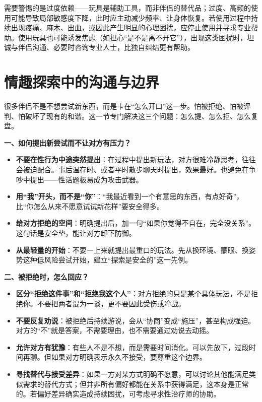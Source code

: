 \documentclass[12pt,UTF8]{ctexbook}
\begin{document}
需要警惕的是过度依赖——玩具是辅助工具，而非伴侣的替代品；过度、高频的使用可能导致局部敏感度下降，此时应主动减少频率、让身体恢复。若使用过程中持续出现疼痛、麻木、出血，或因此产生明显的心理困扰，应停止使用并寻求专业帮助。使用玩具也可能诱发焦虑（如担心“是不是离不开它”），出现这类困扰时，坦诚与伴侣沟通、必要时咨询专业人士，比独自纠结更有帮助。

\section{情趣探索中的沟通与边界}

很多伴侣不是不想尝试新东西，而是卡在“怎么开口”这一步。怕被拒绝、怕被评判、怕破坏了现有的和谐。这一节专门解决这三个问题：怎么提、怎么拒、怎么复盘。

\textbf{一、如何提出新尝试而不让对方有压力？}

\begin{itemize}
\item \textbf{不要在性行为中途突然提出}：在过程中提出新玩法，对方很难冷静思考，往往会被迫配合。事后温存时、或者平时散步聊天时提出，效果最好。也避免在争吵中提出——性话题极易成为攻击武器。
\item \textbf{用“我”开头，而不是“你”}：“我最近看到一个有意思的东西，有点好奇”，比“你怎么从来不愿意试试新花样”要安全得多。
\item \textbf{给对方拒绝的空间}：明确提出后，加一句“如果你觉得不自在，完全没关系”。这句话是安全垫，能让对方卸下防御。
\item \textbf{从最轻量的开始}：不要一上来就提出最重口的玩法。先从换环境、蒙眼、换姿势这种低风险尝试开始，建立“探索是安全的”这一先例。
\end{itemize}

\textbf{二、被拒绝时，怎么回应？}

\begin{itemize}
\item \textbf{区分“拒绝这件事”和“拒绝我这个人”}：对方拒绝的只是某个具体玩法，不是拒绝你。不要把两者混为一谈，更不要因此受伤或冷战。
\item \textbf{不要反复劝说}：被拒绝后持续游说，会从“协商”变成“施压”，甚至构成强迫。对方的“不”就是答案，不需要理由，也不需要通过劝说去动摇。
\item \textbf{允许对方有犹豫}：有些人不是不想，而是需要时间消化。可以先放下，过段时间再聊。但如果对方明确表示永久不接受，要尊重这个边界。
\item \textbf{寻找替代与接受差异}：如果一方对某方式明确不愿意，可以讨论其他能满足类似需求的替代方式；但并非所有偏好都能在关系中获得满足，这本身是正常的。若偏好差异确实造成持续困扰，可考虑寻求性治疗师的协助。
\end{itemize}
\end{document}
